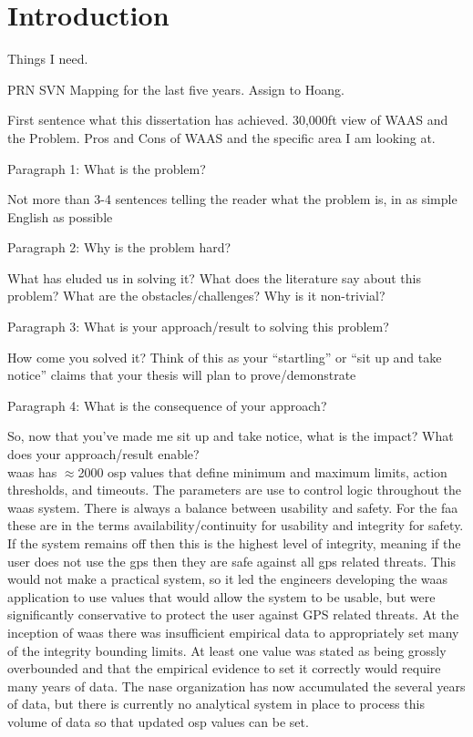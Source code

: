 \chapter{Introduction}
\label{chapter:introduction}
Things I need.

PRN SVN Mapping for the last five years.
Assign to Hoang.


First sentence what this dissertation has achieved.
30,000ft view of WAAS and the Problem. Pros and Cons of WAAS and the specific area I am looking at.

Paragraph 1: What is the problem?

Not more than 3-4 sentences telling the reader what the problem is, in as simple English as possible

Paragraph 2: Why is the problem hard?

What has eluded us in solving it? What does the literature say about this problem? What are the obstacles/challenges? Why is it non-trivial?

Paragraph 3: What is your approach/result to solving this problem?

How come you solved it? Think of this as your “startling” or “sit up and take notice” claims that your thesis will plan to prove/demonstrate

Paragraph 4: What is the consequence of your approach?

So, now that you’ve made me sit up and take notice, what is the impact? What does your approach/result enable?
~\\

\ac{waas} has $\approx$2000 \ac{osp} values that define minimum and maximum limits, action thresholds, and timeouts. The parameters are use to control logic throughout the \ac{waas} system. There is always a balance between usability and safety.  For the \ac{faa} these are in the terms availability/continuity for usability and integrity for safety.  If the system remains off then this is the highest level of integrity, meaning if the user does not use the \ac{gps} then they are safe against all \ac{gps} related threats.  This would not make a practical system, so it led the engineers developing the \ac{waas} application to use values that would allow the system to be usable, but were significantly conservative to protect the user against GPS related threats.  At the inception of \ac{waas} there was insufficient empirical data to appropriately set many of the integrity bounding limits.  At least one value was stated as being grossly overbounded and that the empirical evidence to set it correctly would require many years of data.  The \ac{nase} organization has now accumulated the several years of data, but there is currently no analytical system in place to process this volume of data so that updated \ac{osp} values can be set.


